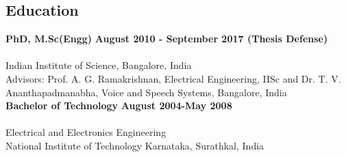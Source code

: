 \documentclass[line]{resume}
\begin{document}
{\begin{resume}
			\section{\mysidestyle Education}
			\vspace{1mm}
			\textbf{PhD, M.Sc(Engg)} \hfill \textbf{ August 2010 - September 2017 (Thesis Defense)}\vspace{-3mm}\\\vspace{-1mm}\\%
			Indian Institute of Science, Bangalore, India \vspace{0mm}\\%
			Advisors: Prof. A. G. Ramakrishnan, Electrical Engineering, IISc and Dr. T. V. Ananthapadmanabha, Voice and Speech Systems, Bangalore, India\vspace{-6mm}\\
			
			\textbf{Bachelor of Technology} \hfill \textbf{ August 2004-May 2008}\vspace{-3mm}\\\vspace{-1mm}\\%
			 Electrical and Electronics Engineering\\
			National Institute of Technology Karnataka, Surathkal, India \vspace{0mm}\\%
			
			
			\vspace{-1.5mm}
			

\end{resume}}
\end{document}
